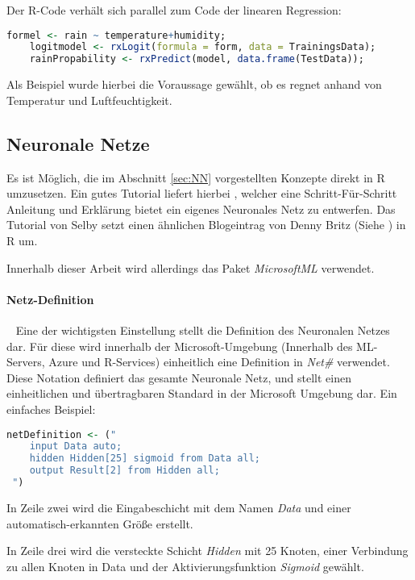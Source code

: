 Der R-Code verhält sich parallel zum Code der linearen Regression:

\begin{lstlisting}[language=R]
	formel <- rain ~ temperature+humidity;
	logitmodel <- rxLogit(formula = form, data = TrainingsData);
	rainPropability <- rxPredict(model, data.frame(TestData));
\end{lstlisting}

Als Beispiel wurde hierbei die Voraussage gewählt, ob es regnet anhand von Temperatur und Luftfeuchtigkeit.
\subsection{Neuronale Netze}
Es ist Möglich, die im Abschnitt \ref{sec:NN} vorgestellten Konzepte direkt in R umzusetzen. Ein gutes Tutorial liefert hierbei \cite{SelbyNN}, welcher eine Schritt-Für-Schritt Anleitung und Erklärung bietet ein eigenes Neuronales Netz zu entwerfen. Das Tutorial von Selby setzt einen ähnlichen Blogeintrag von Denny Britz (Siehe \cite{DennyNN}) in R um. 

Innerhalb dieser Arbeit wird allerdings das Paket \textit{MicrosoftML} verwendet.

\paragraph{Netz-Definition} ~\newline
Eine der wichtigsten Einstellung stellt die Definition des Neuronalen Netzes dar. Für diese wird innerhalb der Microsoft-Umgebung (Innerhalb des ML-Servers, Azure und R-Services) einheitlich eine Definition in \textit{Net\#} verwendet. Diese Notation definiert  das gesamte Neuronale Netz, und stellt einen einheitlichen und übertragbaren Standard in der Microsoft Umgebung dar. Ein einfaches Beispiel: ~\newline

\begin{lstlisting}[language=R]
 netDefinition <- ("
 	input Data auto;
 	hidden Hidden[25] sigmoid from Data all;
 	output Result[2] from Hidden all;  
 ")
\end{lstlisting}

In Zeile zwei wird die Eingabeschicht mit dem Namen \textit{Data} und einer automatisch-erkannten Größe erstellt. 

In Zeile drei wird die versteckte Schicht \textit{Hidden} mit 25 Knoten, einer Verbindung zu allen Knoten in Data und der Aktivierungsfunktion \textit{Sigmoid} gewählt. 

